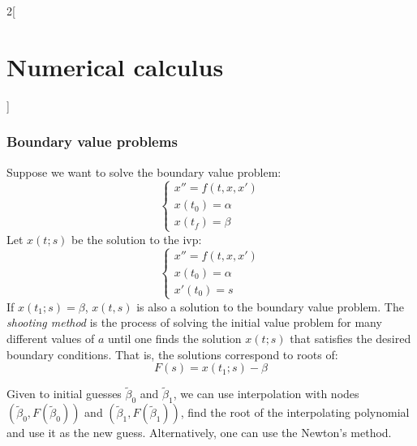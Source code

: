 \documentclass[../../../main_math.tex]{subfiles}
\begin{document}
\begin{multicols}{2}[\section{Numerical calculus}]
  \subsubsection{Boundary value problems}
  \begin{definition}
    Suppose we want to solve the boundary value problem:
    \begin{equation*}
      \begin{cases}
        x'' =f(t, x, x') \\
        x(t_0)=\alpha    \\
        x(t_f)=\beta
      \end{cases}
    \end{equation*}
    Let $x(t;s)$ be the solution to the ivp:
    \begin{equation*}
      \begin{cases}
        x'' =f(t, x, x') \\
        x(t_0)=\alpha    \\
        x'(t_0)=s
      \end{cases}
    \end{equation*}
    If $x(t_1;s)=\beta$, $x(t,s)$ is also a solution to the boundary value problem. The \emph{shooting method} is the process of solving the initial value problem for many different values of $a$ until one finds the solution $x(t;s)$ that satisfies the desired boundary conditions. That is, the solutions correspond to roots of:
    $$
      F(s)=x(t_1;s)-\beta
    $$
  \end{definition}
  \begin{remark}
    Given to initial guesses $\tilde\beta_0$ and $\tilde\beta_1$, we can use interpolation with nodes $(\tilde\beta_0, F(\tilde\beta_0))$ and $(\tilde\beta_1, F(\tilde\beta_1))$, find the root of the interpolating polynomial and use it as the new guess. Alternatively, one can use the Newton's method.
  \end{remark}
\end{multicols}
\end{document}
